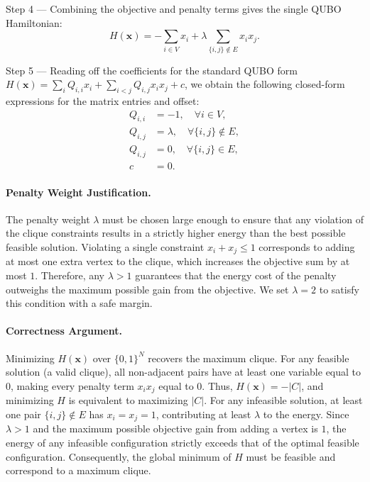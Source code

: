 \documentclass[12pt]{article}
\begin{document}
Step 4 --- Combining the objective and penalty terms gives the single QUBO Hamiltonian:
\begin{equation}
    H(\mathbf{x}) = -\sum_{i \in V} x_i + \lambda \sum_{\{i,j\} \notin E} x_i x_j.
\end{equation}

Step 5 --- Reading off the coefficients for the standard QUBO form $H(\mathbf{x}) = \sum_{i} Q_{i,i} x_i + \sum_{i<j} Q_{i,j} x_i x_j + c$, we obtain the following closed-form expressions for the matrix entries and offset:
\begin{align}
    Q_{i,i} &= -1, \quad \forall i \in V, \\
    Q_{i,j} &= \lambda, \quad \forall \{i,j\} \notin E, \\
    Q_{i,j} &= 0, \quad \forall \{i,j\} \in E, \\
    c &= 0.
\end{align}

\paragraph{Penalty Weight Justification.}
The penalty weight $\lambda$ must be chosen large enough to ensure that any violation of the clique constraints results in a strictly higher energy than the best possible feasible solution. Violating a single constraint $x_i + x_j \le 1$ corresponds to adding at most one extra vertex to the clique, which increases the objective sum by at most $1$. Therefore, any $\lambda > 1$ guarantees that the energy cost of the penalty outweighs the maximum possible gain from the objective. We set $\lambda = 2$ to satisfy this condition with a safe margin.

\paragraph{Correctness Argument.}
Minimizing $H(\mathbf{x})$ over $\{0,1\}^N$ recovers the maximum clique. For any feasible solution (a valid clique), all non-adjacent pairs have at least one variable equal to $0$, making every penalty term $x_i x_j$ equal to $0$. Thus, $H(\mathbf{x}) = -|C|$, and minimizing $H$ is equivalent to maximizing $|C|$. For any infeasible solution, at least one pair $\{i,j\} \notin E$ has $x_i = x_j = 1$, contributing at least $\lambda$ to the energy. Since $\lambda > 1$ and the maximum possible objective gain from adding a vertex is $1$, the energy of any infeasible configuration strictly exceeds that of the optimal feasible configuration. Consequently, the global minimum of $H$ must be feasible and correspond to a maximum clique.
\end{document}
